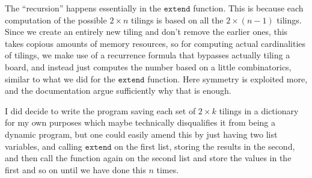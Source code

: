 \documentclass[11pt,a4paper]{article}
\begin{document}
\begin{center}
\hspace{1cm}
\end{center}

The ``recursion'' happens essentially in the $\texttt{extend}$ function. This
is because each computation of the possible $2\times n$ tilings is based on all
the $2\times (n-1)$ tilings. Since we create an entirely new tiling and don't
remove the earlier ones, this takes copious amounts of memory resources, so for
computing actual cardinalities of tilings, we make use of a recurrence formula
that bypasses actually tiling a board, and instead just computes the number
based on a little combinatorics, similar to what we did for the
$\texttt{extend}$ function. Here symmetry is exploited more, and the
documentation argue sufficiently why that is enough.

I did decide to write the program saving each set of $2\times k$ tilings in a dictionary for my own purposes which maybe technically disqualifies it from being a 
dynamic program, but one could easily amend this by just having two list variables,
and calling $\texttt{extend}$ on the first list, storing the results in the second, and then call the function again on the second list and store the values in the first and so on until we have done this $n$ times.
\end{document}
